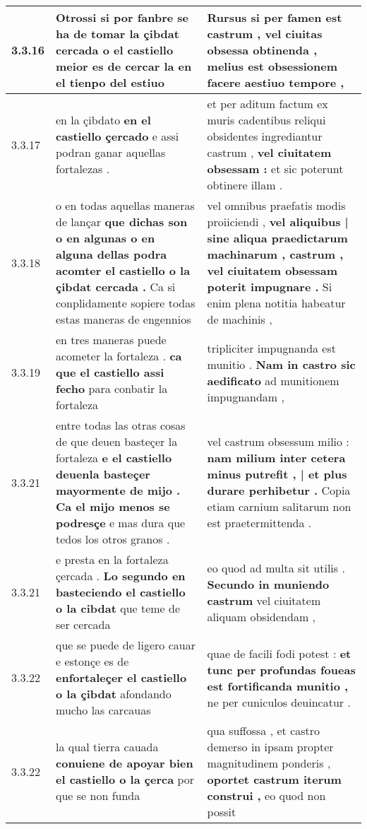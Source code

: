 \begin{tabular}{|p{1cm}|p{6.5cm}|p{6.5cm}|}

\hline
3.3.16 & Otrossi si por fanbre se ha de tomar la çibdat cercada \textbf{ o el castiello } meior es de cercar la en el tienpo del estiuo & Rursus si per famen est castrum , \textbf{ vel ciuitas obsessa obtinenda , } melius est obsessionem facere aestiuo tempore , \\\hline
3.3.17 & en la çibdato \textbf{ en el castiello çercado } e assi podran ganar aquellas fortalezas . & et per aditum factum ex muris cadentibus reliqui obsidentes ingrediantur castrum , \textbf{ vel ciuitatem obsessam : } et sic poterunt obtinere illam . \\\hline
3.3.18 & o en todas aquellas maneras de lançar \textbf{ que dichas son o en algunas o en alguna dellas podra acomter el castiello o la çibdat cercada . } Ca si conplidamente sopiere todas estas maneras de engennios & vel omnibus praefatis modis proiiciendi , \textbf{ vel aliquibus | sine aliqua praedictarum machinarum , castrum , vel ciuitatem obsessam poterit impugnare . } Si enim plena notitia habeatur de machinis , \\\hline
3.3.19 & en tres maneras puede acometer la fortaleza . \textbf{ ca que el castiello assi fecho } para conbatir la fortaleza & tripliciter impugnanda est munitio . \textbf{ Nam in castro sic aedificato } ad munitionem impugnandam , \\\hline
3.3.21 & entre todas las otras cosas de que deuen basteçer la fortaleza \textbf{ e el castiello deuenla basteçer mayormente de mijo . Ca el mijo menos se podresçe } e mas dura que tedos los otros granos . & vel castrum obsessum milio : \textbf{ nam milium inter cetera minus putrefit , | et plus durare perhibetur . } Copia etiam carnium salitarum non est praetermittenda . \\\hline
3.3.21 & e presta en la fortaleza çercada . \textbf{ Lo segundo en basteciendo el castiello o la cibdat } que teme de ser cercada & eo quod ad multa sit utilis . \textbf{ Secundo in muniendo castrum } vel ciuitatem aliquam obsidendam , \\\hline
3.3.22 & que se puede de ligero cauar e estonçe es de \textbf{ enfortaleçer el castiello o la çibdat } afondando mucho las carcauas & quae de facili fodi potest : \textbf{ et tunc per profundas foueas est fortificanda munitio , } ne per cuniculos deuincatur . \\\hline
3.3.22 & la qual tierra cauada \textbf{ conuiene de apoyar bien el castiello o la çerca } por que se non funda & qua suffossa , et castro demerso in ipsam propter magnitudinem ponderis , \textbf{ oportet castrum iterum construi , } eo quod non possit \\\hline

\end{tabular}
